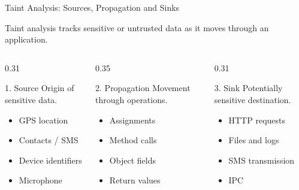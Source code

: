 \documentclass[aspectratio=169,10pt]{beamer}
\begin{document}
\begin{frame}{Taint Analysis: Sources, Propagation and Sinks}

Taint analysis tracks sensitive or untrusted data as it moves through an application.

\vspace{5pt}

\begin{columns}[T]

\begin{column}{0.31\textwidth}

\begin{block}{1. Source}
Origin of sensitive data.

\begin{itemize}
    \item GPS location
    \item Contacts / SMS
    \item Device identifiers
    \item Microphone
\end{itemize}

\end{block}

\end{column}

\begin{column}{0.35\textwidth}

\begin{block}{2. Propagation}
Movement through operations.

\begin{itemize}
    \item Assignments
    \item Method calls
    \item Object fields
    \item Return values
\end{itemize}

\end{block}

\end{column}

\begin{column}{0.31\textwidth}

\begin{block}{3. Sink}
Potentially sensitive destination.

\begin{itemize}
    \item HTTP requests
    \item Files and logs
    \item SMS transmission
    \item IPC
\end{itemize}


\end{block}
\end{column}
\end{columns}
\end{frame}
\end{document}
